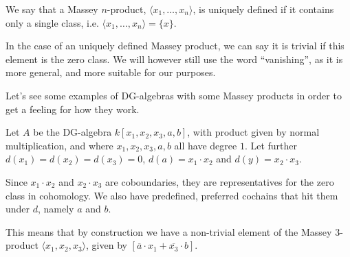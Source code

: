 \begin{definition}
We say that a Massey $n$-product, $\langle x_1, \ldots, x_n\rangle$, is uniquely defined if it contains only a single class, i.e. $\langle x_1, \ldots, x_n\rangle=\{x\}$. 
\end{definition}

In the case of an uniquely defined Massey product, we can say it is trivial if this element is the zero class. We will however still use the word ``vanishing'', as it is more general, and more suitable for our purposes. 

Let's see some examples of DG-algebras with some Massey products in order to get a feeling for how they work. 

\begin{example}
Let $A$ be the DG-algebra $k[x_1,x_2,x_3,a,b]$, with product given by normal multiplication, and where $x_1, x_2, x_3, a, b$ all have degree $1$. Let further $d(x_1)=d(x_2)=d(x_3)=0$, $d(a)=x_1\cdot x_2$ and $d(y)=x_2\cdot x_3$. 

Since $x_1\cdot x_2$ and $x_2\cdot x_3$ are coboundaries, they are representatives for the zero class in cohomology. We also have predefined, preferred cochains that hit them under $d$, namely $a$ and $b$. 

This means that by construction we have a non-trivial element of the Massey 3-product $\langle x_1, x_2, x_3\rangle$, given by $[\overline{a}\cdot x_1 + \overline{x_3}\cdot b]$. 
\end{example}

